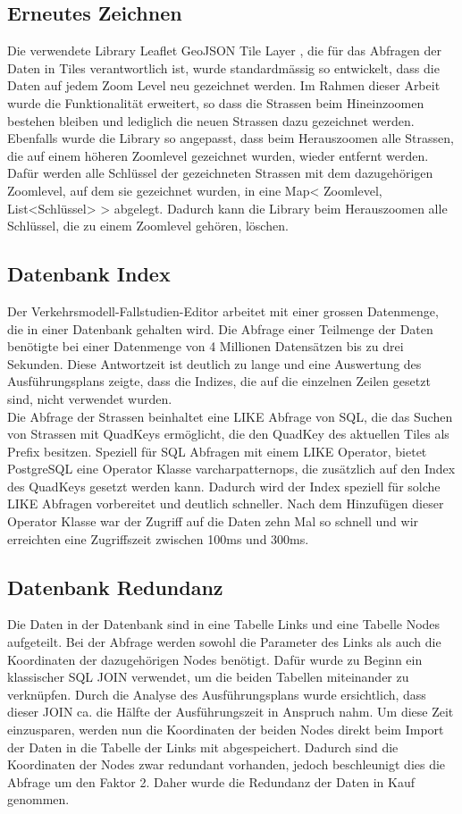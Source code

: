 \subsection{Erneutes Zeichnen}
Die verwendete Library \glqq{}Leaflet GeoJSON Tile Layer\grqq{} \cite{LeafletGeoJSON}, die für das Abfragen der Daten in Tiles verantwortlich ist, wurde standardmässig so entwickelt, dass die Daten auf jedem Zoom Level neu gezeichnet werden. Im Rahmen dieser Arbeit wurde die Funktionalität erweitert, so dass die Strassen beim Hineinzoomen bestehen bleiben und lediglich die neuen Strassen dazu gezeichnet werden. Ebenfalls wurde die Library so angepasst, dass  beim Herauszoomen alle Strassen, die auf einem höheren Zoomlevel gezeichnet wurden, wieder entfernt werden. Dafür werden alle Schlüssel der gezeichneten Strassen mit dem dazugehörigen Zoomlevel, auf dem sie gezeichnet wurden, in eine Map< Zoomlevel, List<Schlüssel> > abgelegt. Dadurch kann die Library beim Herauszoomen alle Schlüssel, die zu einem Zoomlevel gehören, löschen.
\subsection{Datenbank Index}
Der Verkehrsmodell-Fallstudien-Editor arbeitet mit einer grossen Datenmenge, die in einer Datenbank gehalten wird. Die Abfrage einer Teilmenge der Daten benötigte bei einer Datenmenge von 4 Millionen Datensätzen bis zu drei Sekunden. Diese Antwortzeit ist deutlich zu lange und eine Auswertung des Ausführungsplans zeigte, dass die Indizes, die auf die einzelnen Zeilen gesetzt sind, nicht verwendet wurden.\\
Die Abfrage der Strassen beinhaltet eine LIKE Abfrage von SQL, die das Suchen von Strassen mit QuadKeys ermöglicht, die den QuadKey des aktuellen Tiles als Prefix besitzen. Speziell für SQL Abfragen mit einem LIKE Operator, bietet PostgreSQL eine Operator Klasse \glqq{}varchar\textunderscore pattern\textunderscore ops\grqq{}, die zusätzlich auf den Index des QuadKeys gesetzt werden kann. Dadurch wird der Index speziell für solche LIKE Abfragen vorbereitet und deutlich schneller. Nach dem Hinzufügen dieser Operator Klasse war der Zugriff auf die Daten zehn Mal so schnell und wir erreichten eine Zugriffszeit zwischen 100ms und 300ms.
\subsection{Datenbank Redundanz} \label{ch:redundance}
Die Daten in der Datenbank sind in eine Tabelle \glqq{}Links\grqq{} und eine Tabelle \glqq{}Nodes\grqq{} aufgeteilt. Bei der Abfrage werden sowohl die Parameter des Links als auch die Koordinaten der dazugehörigen Nodes benötigt. Dafür wurde zu Beginn ein klassischer SQL JOIN verwendet, um die beiden Tabellen miteinander zu verknüpfen. Durch die Analyse des Ausführungsplans wurde ersichtlich, dass dieser JOIN ca. die Hälfte der Ausführungszeit in Anspruch nahm. Um diese Zeit einzusparen, werden nun die Koordinaten der beiden Nodes direkt beim Import der Daten in die Tabelle der Links mit abgespeichert. Dadurch sind die Koordinaten der Nodes zwar redundant vorhanden, jedoch beschleunigt dies die Abfrage um den Faktor 2. Daher wurde die Redundanz der Daten in Kauf genommen.
\newpage